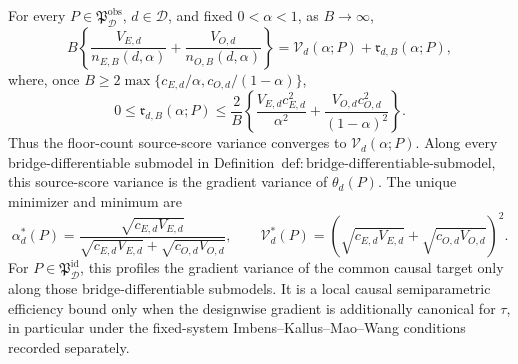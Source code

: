 For every \(P\in\mathfrak P_{\mathcal D}^{\mathrm{obs}}\), \(d\in\mathcal D\), and fixed \(0<\alpha<1\), as \(B\to\infty\),
\[
B\left\{\frac{V_{E,d}}{n_{E,B}(d,\alpha)}+\frac{V_{O,d}}{n_{O,B}(d,\alpha)}\right\}
=\mathcal V_d(\alpha;P)+\mathfrak r_{d,B}(\alpha;P),
\]
where, once \(B\ge2\max\{c_{E,d}/\alpha,c_{O,d}/(1-\alpha)\}\),
\[
0\le\mathfrak r_{d,B}(\alpha;P)\le \frac2B\left\{
\frac{V_{E,d}c_{E,d}^2}{\alpha^2}+
\frac{V_{O,d}c_{O,d}^2}{(1-\alpha)^2}\right\}.
\]
Thus the floor-count source-score variance converges to \(\mathcal V_d(\alpha;P)\). Along every bridge-differentiable submodel in Definition~\(\mathrm{def{:}bridge\text{-}differentiable\text{-}submodel}\), this source-score variance is the gradient variance of \(\theta_d(P)\). The unique minimizer and minimum are
\[
\alpha_d^*(P)=\frac{\sqrt{c_{E,d}V_{E,d}}}{\sqrt{c_{E,d}V_{E,d}}+\sqrt{c_{O,d}V_{O,d}}},
\qquad
\mathcal V_d^*(P)=\left(\sqrt{c_{E,d}V_{E,d}}+\sqrt{c_{O,d}V_{O,d}}\right)^2.
\]
For \(P\in\mathfrak P_{\mathcal D}^{\mathrm{id}}\), this profiles the gradient variance of the common causal target only along those bridge-differentiable submodels. It is a local causal semiparametric efficiency bound only when the designwise gradient is additionally canonical for \(\tau\), in particular under the fixed-system Imbens--Kallus--Mao--Wang conditions recorded separately.